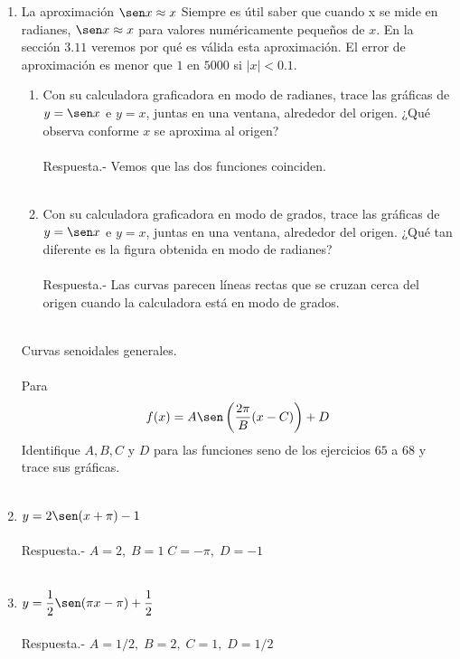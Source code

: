 \begin{enumerate}
\item La aproximación $\sen x \approx x$ Siempre es útil saber que cuando x se mide en radianes, $\sen x \approx x$ para valores numéricamente pequeños de $x$. En la sección $3.11$ veremos por qué es válida esta aproximación. El error de aproximación es menor que $1$ en $5000$ si $|x|<0.1$.
    \begin{enumerate}[\bfseries a)]
	
	\item Con su calculadora graficadora en modo de radianes, trace las gráficas de $y = \sen x$ e $y = x$, juntas en una ventana, alrededor del origen. ¿Qué observa conforme $x$ se aproxima al origen?\\\\
	    Respuesta.-\; Vemos que las dos funciones coinciden.\\\\ 

	\item Con su calculadora graficadora en modo de grados, trace las gráficas de $y = \sen x$ e $y = x$, juntas en una ventana, alrededor del origen. ¿Qué tan diferente es la figura obtenida en modo de radianes?\\\\
	    Respuesta.-\; Las curvas parecen líneas rectas que se cruzan cerca del origen cuando la calculadora está en modo de grados.\\\\

    \end{enumerate}

Curvas senoidales generales.\\\\
Para $$f(x)=A\sen\left(\dfrac{2\pi}{B}(x-C)\right)+D$$
Identifique $A,B,C$ y $D$ para las funciones seno de los ejercicios $65$ a $68$ y trace sus gráficas.\\\\

\item $y=2\sen(x + \pi) - 1$\\\\
    Respuesta.-\; $A=2, \; B=1 \; C = -\pi, \; D = -1$\\\\

\item $y=\dfrac{1}{2}\sen(\pi x - \pi) + \dfrac{1}{2}$\\\\
    Respuesta.-\; $A=1/2,\; B=2,\; C=1,\; D=1/2$\\\\


\end{enumerate}
